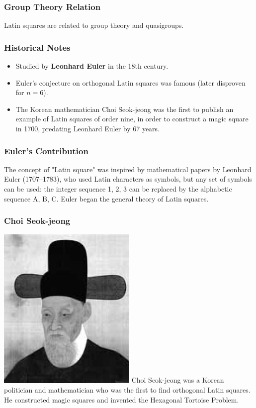 \documentclass{beamer}
\begin{document}
\begin{frame}
\frametitle{Group Theory Relation}
Latin squares are related to group theory and quasigroups.
\end{frame}

\begin{frame}
\frametitle{Historical Notes}
\begin{itemize}
  \item Studied by \textbf{Leonhard Euler} in the 18th century.
  \item Euler's conjecture on orthogonal Latin squares was famous (later disproven for $n=6$).
  \item The Korean mathematician Choi Seok-jeong was the first to publish an example of Latin squares of order nine, in order to construct a magic square in 1700, predating Leonhard Euler by 67 years.
\end{itemize}
\end{frame}

\begin{frame}
\frametitle{Euler's Contribution}
The concept of "Latin square" was inspired by mathematical papers by Leonhard Euler (1707–1783), who used Latin characters as symbols, but any set of symbols can be used: the integer sequence 1, 2, 3 can be replaced by the alphabetic sequence A, B, C.
Euler began the general theory of Latin squares.
\end{frame}

\begin{frame}
\frametitle{Choi Seok-jeong}
\includegraphics[width=0.5\textwidth]{img12}
Choi Seok-jeong was a Korean politician and mathematician who was the first to find orthogonal Latin squares. He constructed magic squares and invented the Hexagonal Tortoise Problem.
\end{frame}
\end{document}
